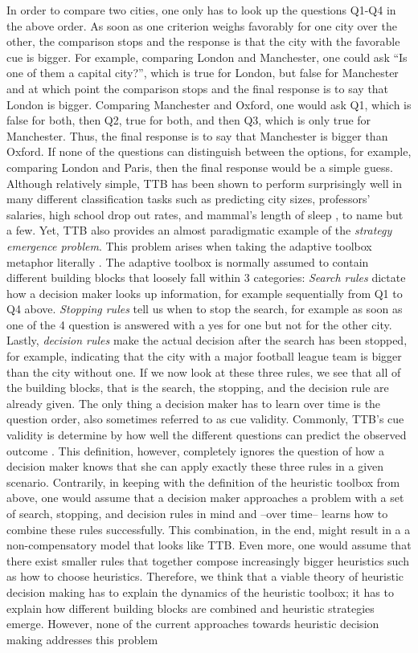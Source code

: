 \documentclass[a4paper,man, natbib]{apa6}
\begin{document}
In order to compare two cities, one only has to look up the questions Q1-Q4 in the above order. As soon as one criterion weighs favorably for one city over the other, the comparison stops and the response is that the city with the favorable cue is bigger. For example, comparing London and Manchester, one could ask ``Is one of them a capital city?'', which is true for London, but false for Manchester and at which point the comparison stops and the final response is to say that London is bigger. Comparing Manchester and Oxford, one would ask Q1, which is false for both, then Q2, true for both, and then Q3, which is only true for Manchester. Thus, the final response is to say that Manchester is bigger than Oxford. If none of the questions can distinguish between the options, for example, comparing London and Paris, then the final response would be a simple guess. Although relatively simple, TTB has been shown to perform surprisingly well in many different classification tasks such as predicting city sizes, professors' salaries, high school drop out rates, and mammal's length of sleep \citep{gigerenzer1999simple}, to name but a few. Yet, TTB also provides an almost paradigmatic example of the \emph{strategy emergence problem}. This problem arises when taking the adaptive toolbox metaphor literally \citep{gigerenzer2011heuristic}. The adaptive toolbox is normally assumed to contain different building blocks that loosely fall within 3 categories: \emph{Search rules} dictate how a decision maker looks up information, for example sequentially from Q1 to Q4 above. \emph{Stopping rules} tell us when to stop the search, for example as soon as one of the 4 question is answered with a yes for one but not for the other city. Lastly, \emph{decision rules} make the actual decision after the search has been stopped, for example, indicating that the city with a major football league team is bigger than the city without one. If we now look at these three rules, we see that all of the building blocks, that is the search, the stopping, and the decision rule are already given. The only thing a decision maker has to learn over time is the question order, also sometimes referred to as cue validity. Commonly, TTB's cue validity is determine by how well the different questions can predict the observed outcome \citep{broder2000assessing}. This definition, however, completely ignores the question of how a decision maker knows that she can apply exactly these three rules in a given scenario. Contrarily, in keeping with the definition of the heuristic toolbox from above, one would assume that a decision maker approaches a problem with a set of search, stopping, and decision rules in mind and --over time-- learns how to combine these rules successfully. This combination, in the end, might result in a a non-compensatory model that looks like TTB. Even more, one would assume that there exist smaller rules that together compose increasingly bigger heuristics such as how to choose heuristics. Therefore, we think that a viable theory of heuristic decision making has to explain the dynamics of the heuristic toolbox; it has to explain how different building blocks are combined and heuristic strategies emerge. However, none of the current approaches towards heuristic decision making addresses this problem 
\end{document}
